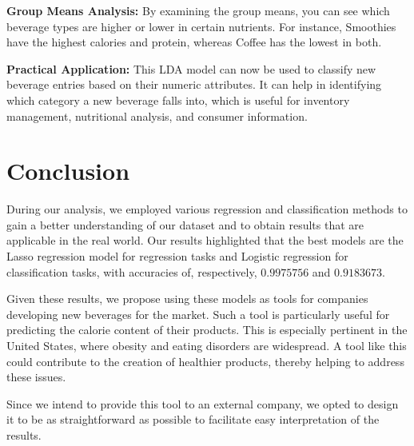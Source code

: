 \documentclass[
]{article}
\begin{document}
\textbf{Group Means Analysis:} By examining the group means, you can see
which beverage types are higher or lower in certain nutrients. For
instance, Smoothies have the highest calories and protein, whereas
Coffee has the lowest in both.

\textbf{Practical Application:} This LDA model can now be used to
classify new beverage entries based on their numeric attributes. It can
help in identifying which category a new beverage falls into, which is
useful for inventory management, nutritional analysis, and consumer
information.

\section{Conclusion}\label{conclusion}

During our analysis, we employed various regression and classification
methods to gain a better understanding of our dataset and to obtain
results that are applicable in the real world. Our results highlighted
that the best models are the Lasso regression model for regression tasks
and Logistic regression for classification tasks, with accuracies of,
respectively, \(0.9975756\) and \(0.9183673\).

Given these results, we propose using these models as tools for
companies developing new beverages for the market. Such a tool is
particularly useful for predicting the calorie content of their
products. This is especially pertinent in the United States, where
obesity and eating disorders are widespread. A tool like this could
contribute to the creation of healthier products, thereby helping to
address these issues.

Since we intend to provide this tool to an external company, we opted to
design it to be as straightforward as possible to facilitate easy
interpretation of the results.
\end{document}
